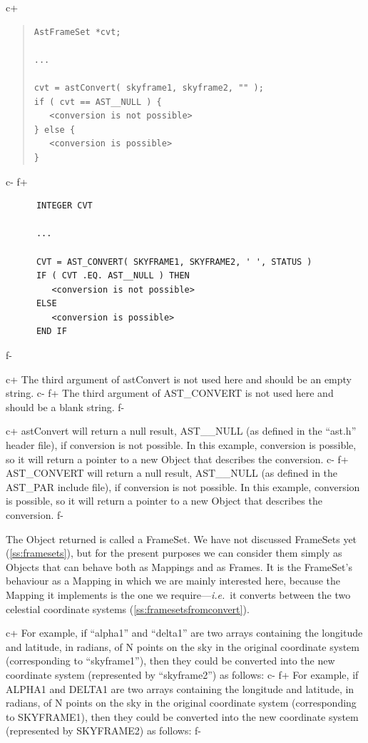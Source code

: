 \documentclass[twoside,11pt]{article}
\newcommand{\secref}[1]{\S\ref{#1}}
\renewcommand{\secref}[1]{\ref{#1}}
\begin{document}
c+
\begin{quote}
\small
\begin{verbatim}
AstFrameSet *cvt;

...

cvt = astConvert( skyframe1, skyframe2, "" );
if ( cvt == AST__NULL ) {
   <conversion is not possible>
} else {
   <conversion is possible>
}
\end{verbatim}
\normalsize
\end{quote}
c-
f+
\small
\begin{verbatim}
      INTEGER CVT

      ...

      CVT = AST_CONVERT( SKYFRAME1, SKYFRAME2, ' ', STATUS )
      IF ( CVT .EQ. AST__NULL ) THEN
         <conversion is not possible>
      ELSE
         <conversion is possible>
      END IF
\end{verbatim}
\normalsize
f-

c+
The third argument of astConvert is not used here and should be an
empty string.
c-
f+
The third argument of AST\_CONVERT is not used here and should be a
blank string.
f-

c+
astConvert will return a null result, AST\_\_NULL (as defined in the
``ast.h'' header file), if conversion is not possible. In this
example, conversion is possible, so it will return a pointer to a new
Object that describes the conversion.
c-
f+
AST\_CONVERT will return a null result, AST\_\_NULL (as defined in the
AST\_PAR include file), if conversion is not possible. In this
example, conversion is possible, so it will return a pointer to a new
Object that describes the conversion.
f-

The Object returned is called a FrameSet. We have not discussed
FrameSets yet (\secref{ss:framesets}), but for the present purposes we
can consider them simply as Objects that can behave both as Mappings
and as Frames. It is the FrameSet's behaviour as a Mapping in which we
are mainly interested here, because the Mapping it implements is the
one we require---{\em{i.e.}}\ it converts between the two celestial
coordinate systems (\secref{ss:framesetsfromconvert}).

c+
For example, if ``alpha1'' and ``delta1'' are two arrays containing
the longitude and latitude, in radians, of N points on the sky in the
original coordinate system (corresponding to ``skyframe1''), then they
could be converted into the new coordinate system (represented by
``skyframe2'') as follows:
c-
f+
For example, if ALPHA1 and DELTA1 are two arrays containing the
longitude and latitude, in radians, of N points on the sky in the
original coordinate system (corresponding to SKYFRAME1), then they
could be converted into the new coordinate system (represented by
SKYFRAME2) as follows:
f-
\end{document}
